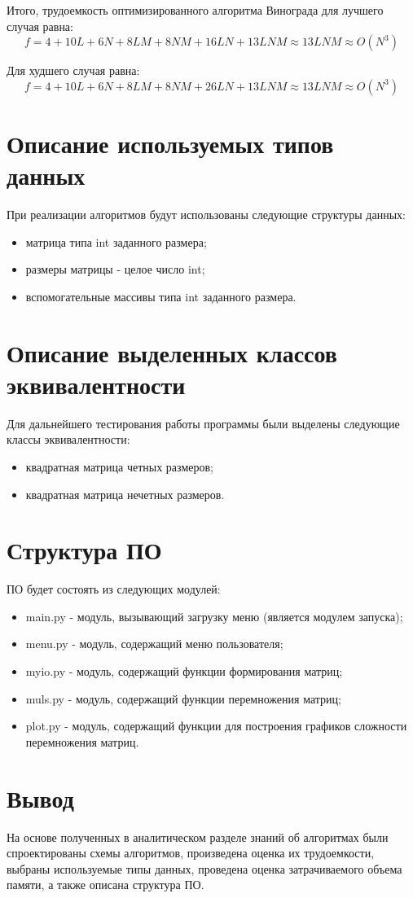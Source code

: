Итого, трудоемкость оптимизированного алгоритма Винограда для лучшего случая равна:
\begin{equation}
	f = 4 + 10L + 6N + 8LM + 8NM + 16LN + 13LNM \approx 13LNM \approx O(N^3)
\end{equation}

Для худшего случая равна:
\begin{equation}
	f = 4 + 10L + 6N + 8LM + 8NM + 26LN + 13LNM \approx 13LNM \approx O(N^3)
\end{equation}

\section{Описание используемых типов данных}

При реализации алгоритмов будут использованы следующие структуры данных:
\begin{itemize}
	\item матрица типа int заданного размера;
	\item размеры матрицы - целое число int;
	\item вспомогательные массивы типа int заданного размера.
\end{itemize}

\section{Описание выделенных классов эквивалентности}

Для дальнейшего тестирования работы программы были выделены следующие классы эквивалентности:
\begin{itemize}
	\item квадратная матрица четных размеров;
	\item квадратная матрица нечетных размеров.
\end{itemize}

\section{Структура ПО}

ПО будет состоять из следующих модулей:
\begin{itemize}
	\item main.py - модуль, вызывающий загрузку меню (является модулем запуска);
	\item menu.py - модуль, содержащий меню пользователя;
	\item myio.py - модуль, содержащий функции формирования матриц;
	\item muls.py - модуль, содержащий функции перемножения матриц;
	\item plot.py - модуль, содержащий функции для построения графиков сложности перемножения матриц.
\end{itemize}

\section{Вывод}

На основе полученных в аналитическом разделе знаний об алгоритмах были спроектированы схемы алгоритмов, произведена оценка их трудоемкости, выбраны используемые типы данных, проведена оценка затрачиваемого объема памяти, а также описана структура ПО.